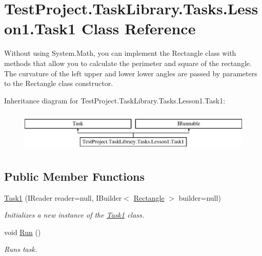 \hypertarget{class_test_project_1_1_task_library_1_1_tasks_1_1_lesson1_1_1_task1}{}\section{Test\+Project.\+Task\+Library.\+Tasks.\+Lesson1.\+Task1 Class Reference}
\label{class_test_project_1_1_task_library_1_1_tasks_1_1_lesson1_1_1_task1}


Without using System.\+Math, you can implement the Rectangle class with methods that allow you to calculate the perimeter and square of the rectangle. The curvature of the left upper and lower lower angles are passed by parameters to the Rectangle class constructor.  


Inheritance diagram for Test\+Project.\+Task\+Library.\+Tasks.\+Lesson1.\+Task1\+:\begin{figure}[H]
\begin{center}
\leavevmode
\includegraphics[height=2.000000cm]{class_test_project_1_1_task_library_1_1_tasks_1_1_lesson1_1_1_task1}
\end{center}
\end{figure}
\subsection*{Public Member Functions}
\begin{DoxyCompactItemize}
\item 
\mbox{\hyperlink{class_test_project_1_1_task_library_1_1_tasks_1_1_lesson1_1_1_task1_a85410dd09234849ea3e2704766f0b013}{Task1}} (I\+Reader reader=null, I\+Builder$<$ \mbox{\hyperlink{class_test_project_1_1_task_library_1_1_tasks_1_1_lesson1_1_1_models_1_1_rectangle}{Rectangle}} $>$ builder=null)
\begin{DoxyCompactList}\small\item\em Initializes a new instance of the \mbox{\hyperlink{class_test_project_1_1_task_library_1_1_tasks_1_1_lesson1_1_1_task1}{Task1}} class. \end{DoxyCompactList}\item 
void \mbox{\hyperlink{class_test_project_1_1_task_library_1_1_tasks_1_1_lesson1_1_1_task1_ad1fef5c532d4505f27bc8aa49ae7ec11}{Run}} ()
\begin{DoxyCompactList}\small\item\em Runs task. \end{DoxyCompactList}\end{DoxyCompactItemize}


